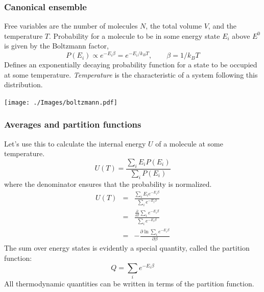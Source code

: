 \documentclass[11pt]{article}
\begin{document}
\subsubsection{Canonical ensemble}
\label{sec:org16e9d5e}
Free variables are the number of molecules \(N\), the total volume \(V\),
and the temperature \(T\).  Probability for a molecule to be in some
energy state \(E_i\) above \(E^0\) is given by the Boltzmann factor,
\begin{equation}
  P(E_i) \propto e^{-E_i\beta}=e^{-E_i/k_BT},\qquad\beta=1/k_BT
\end{equation}
Defines an exponentially decaying probability function for a state to be
occupied at some temperature.  \emph{Temperature} is the characteristic of
a system following this distribution.

\begin{center}
\texttt{[image: ./Images/boltzmann.pdf]}
\end{center}

\subsubsection{Averages and partition functions}
\label{sec:org36f79dd}
Let's use this to calculate the internal energy \(U\) of a molecule at some
temperature.
\begin{equation}
  U(T)=\frac{\sum_iE_iP(E_i)}{\sum_iP(E_i)}
\end{equation}
where the denominator ensures that the probability is normalized.
\begin{eqnarray}
  U(T) & =& \frac{\sum_iE_i e^{-E_i\beta}}{\sum_ie^{-E_i\beta}} \\
  & = & \frac{\frac{\partial}{\partial\beta}\sum_ie^{-E_i\beta}}{\sum_ie^{-E_i
      \beta}}\\
& = & -\frac{\partial \ln \sum_i e^{-E_i\beta}}{\partial \beta}
\end{eqnarray}
The sum over energy states is evidently a special quantity, called the
partition function:
\begin{equation}
  Q=\sum_ie^{-E_i\beta}
\end{equation}
All thermodynamic quantities can be written in terms of the partition function.
\end{document}
